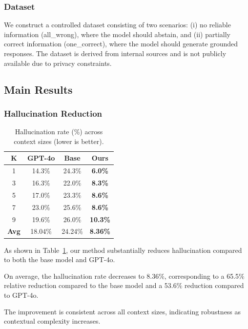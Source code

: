 \subsubsection{Dataset}

We construct a controlled dataset consisting of two scenarios: (i) no reliable information (all\_wrong), where the model should abstain, and (ii) partially correct information (one\_correct), where the model should generate grounded responses. 
The dataset is derived from internal sources and is not publicly available due to privacy constraints.


\subsection{Main Results}

\subsubsection{Hallucination Reduction}

\begin{table}[h]
\centering
\caption{Hallucination rate (\%) across context sizes (lower is better).}
\label{tab:hallucination}
\begin{tabular}{cccc}
\toprule
K & GPT-4o & Base & Ours \\
\midrule
1 & 14.3\% & 24.3\% & \textbf{6.0\%} \\
3 & 16.3\% & 22.0\% & \textbf{8.3\%} \\
5 & 17.0\% & 23.3\% & \textbf{8.6\%} \\
7 & 23.0\% & 25.6\% & \textbf{8.6\%} \\
9 & 19.6\% & 26.0\% & \textbf{10.3\%} \\
\midrule
\textbf{Avg} & 18.04\% & 24.24\% & \textbf{8.36\%} \\
\bottomrule
\end{tabular}
\end{table}

As shown in Table~\ref{tab:hallucination}, our method substantially reduces hallucination compared to both the base model and GPT-4o.

On average, the hallucination rate decreases to 8.36\%, corresponding to a 65.5\% relative reduction compared to the base model and a 53.6\% reduction compared to GPT-4o.

The improvement is consistent across all context sizes, indicating robustness as contextual complexity increases.

